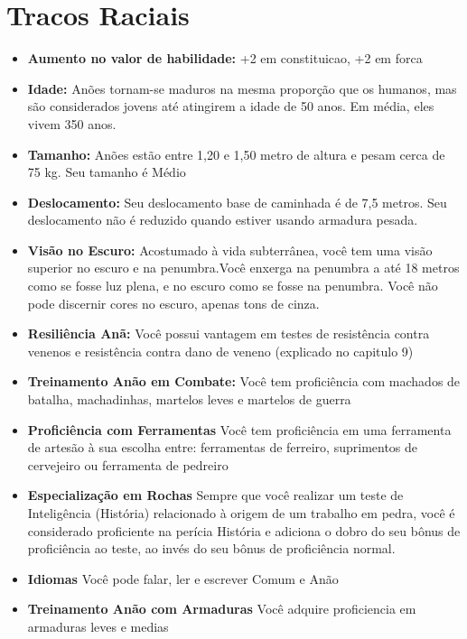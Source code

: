 \documentclass{book}
\begin{document}
\section{Tracos Raciais}
\begin{itemize}
    \item \textbf{Aumento no valor de habilidade:} +2 em constituicao, +2 em forca
    \item \textbf{Idade:} Anões tornam-se maduros na mesma proporção que os humanos, mas são
          considerados jovens até atingirem a idade de 50 anos. Em média, eles vivem 350 anos.
    \item \textbf{Tamanho:} Anões estão entre 1,20 e 1,50 metro de altura e pesam cerca de 
          75 kg. Seu tamanho é Médio
    \item \textbf{Deslocamento:} Seu deslocamento base de caminhada é de 7,5 metros. Seu 
          deslocamento
          não é reduzido quando estiver usando armadura pesada.
    \item \textbf{Visão no Escuro:} Acostumado à vida subterrânea, você tem uma visão 
          superior 
          no escuro e na penumbra.Você enxerga na penumbra a até 18 metros como se fosse 
          luz plena, e no escuro como se fosse na penumbra. Você não pode discernir cores
          no escuro, apenas tons de cinza.
    \item \textbf{Resiliência Anã:} Você possui vantagem em testes de resistência contra    
          venenos  e resistência contra dano de veneno (explicado no capitulo 9)
    \item \textbf{Treinamento Anão em Combate:} Você tem proficiência com machados de 
          batalha, machadinhas, martelos leves e martelos de guerra 
    \item \textbf{Proficiência com Ferramentas} Você tem proficiência em uma ferramenta de 
          artesão à sua escolha entre: ferramentas de ferreiro, suprimentos de cervejeiro ou 
          ferramenta de pedreiro 
    \item \textbf{Especialização em Rochas} Sempre que você realizar um teste de Inteligência
          (História) relacionado à origem de um trabalho em pedra, você é considerado
          proficiente na perícia História e adiciona o dobro do seu bônus de proficiência 
          ao teste, ao invés do seu bônus de proficiência normal.
    \item \textbf{Idiomas} Você pode falar, ler e escrever Comum e Anão
    \item \textbf{Treinamento Anão com Armaduras} Você adquire proficiencia em armaduras leves 
          e medias
\end{itemize}
\end{document}

